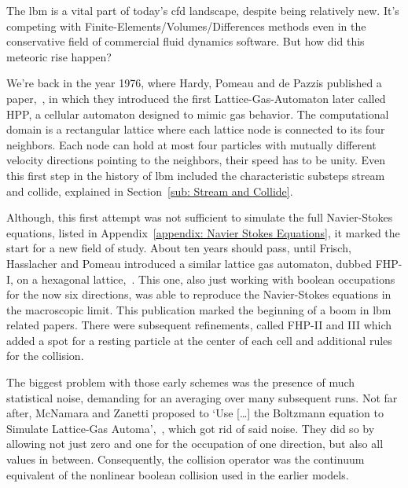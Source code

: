 
The \gls{lbm} is a vital part of today's \gls{cfd} landscape, despite being relatively new.
It's competing with Finite-Elements/Volumes/Differences methods even in the conservative field of commercial fluid dynamics software.
But how did this meteoric rise happen?

We're back in the year 1976, where Hardy, Pomeau and de Pazzis published a paper,~\cite{hardy1976molecular}, in which they introduced the first Lattice-Gas-Automaton later called HPP, a cellular automaton designed to mimic gas behavior.
The computational domain is a rectangular lattice where each lattice node is connected to its four neighbors.
Each node can hold at most four particles with mutually different velocity directions pointing to the neighbors, their speed has to be unity.
Even this first step in the history of \gls{lbm} included the characteristic substeps stream and collide, explained in Section~\ref{sub: Stream and Collide}.

Although, this first attempt was not sufficient to simulate the full Navier-Stokes equations, listed in Appendix~\ref{appendix: Navier Stokes Equations}, it marked the start for a new field of study.
About ten years should pass, until Frisch, Hasslacher and Pomeau introduced a similar lattice gas automaton, dubbed FHP-I, on a hexagonal lattice,~\cite{frisch1986lattice}.
This one, also just working with boolean occupations for the now six directions, was able to reproduce the Navier-Stokes equations in the macroscopic limit.
This publication marked the beginning of a boom in \gls{lbm} related papers.
There were subsequent refinements, called FHP-II and III which added a spot for a resting particle at the center of each cell and additional rules for the collision.

The biggest problem with those early schemes was the presence of much statistical noise, demanding for an averaging over many subsequent runs.
Not far after, McNamara and Zanetti proposed to `Use [\ldots] the Boltzmann equation to Simulate Lattice-Gas Automa',~\cite{PhysRevLett.61.2332}, which got rid of said noise.
They did so by allowing not just zero and one for the occupation of one direction, but also all values in between.
Consequently, the collision operator was the continuum equivalent of the nonlinear boolean collision used in the earlier models.

